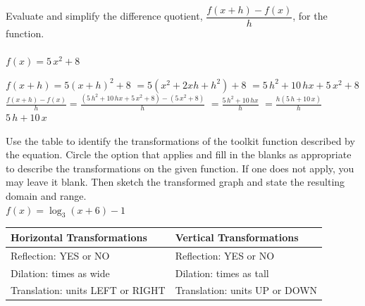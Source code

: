 \documentclass[11pt]{exam}
\begin{document}
\addpoints

\noprintanswers

\blankpage

\thispagestyle{empty}


\newpage



\begin{questions}

\question[10] Evaluate and simplify the difference quotient, $\dfrac{f(x+h)-f(x)}{h}$, for the function. \\ \\ 
\(f(x) = 5 \, x^{2} + 8\)
    \begin{solution}
         \(f(x+h) = 5(x+h)^2 + 8\) 
         \(= 5(x^2 + 2xh + h^2) + 8\) 
         \(= 5 \, h^{2} + 10 \, h x + 5 \, x^{2} + 8\) 
         \(\displaystyle{\frac{f(x+h)-f(x)}{h} = \frac{ (5 \, h^{2} + 10 \, h x + 5 \, x^{2} + 8) - (5 \, x^{2} + 8) }{h}}\) 
         \(=\displaystyle{ \frac{ 5 \, h^{2} + 10 \, h x }{h}}\) 
         \(= \displaystyle{ \frac{ h(5 \, h + 10 \, x) }{h}}\) 
         \(\boxed{ 5 \, h + 10 \, x }\) 
    \end{solution}
\answerline

\newpage

\question[8] Use the table to identify the transformations of the toolkit function described by the equation. Circle the option that applies and fill in the blanks as appropriate to describe the transformations on the given function.  If one does not apply, you may leave it blank. Then sketch the transformed graph and state the resulting domain and range.\\

\(f(x) = \log_{3}(x + 6) - 1\)\\

\renewcommand{\arraystretch}{2.5}

	\begin{tabular}{|l|l|}
		\hline
		\textbf{Horizontal Transformations}               & \textbf{Vertical Transformations}              \\ \hline
		Reflection: YES    or     NO       & Reflection:       YES    or     NO    \\ \hline
		Dilation: \underline{\hspace{2cm}} times as wide           & Dilation: \underline{\hspace{2cm}} times as tall        \\ \hline
		Translation: \underline{\hspace{2cm}} units LEFT or RIGHT & Translation: \underline{\hspace{2cm}} units UP or DOWN \\ \hline
	\end{tabular}


\end{questions}
\end{document}
